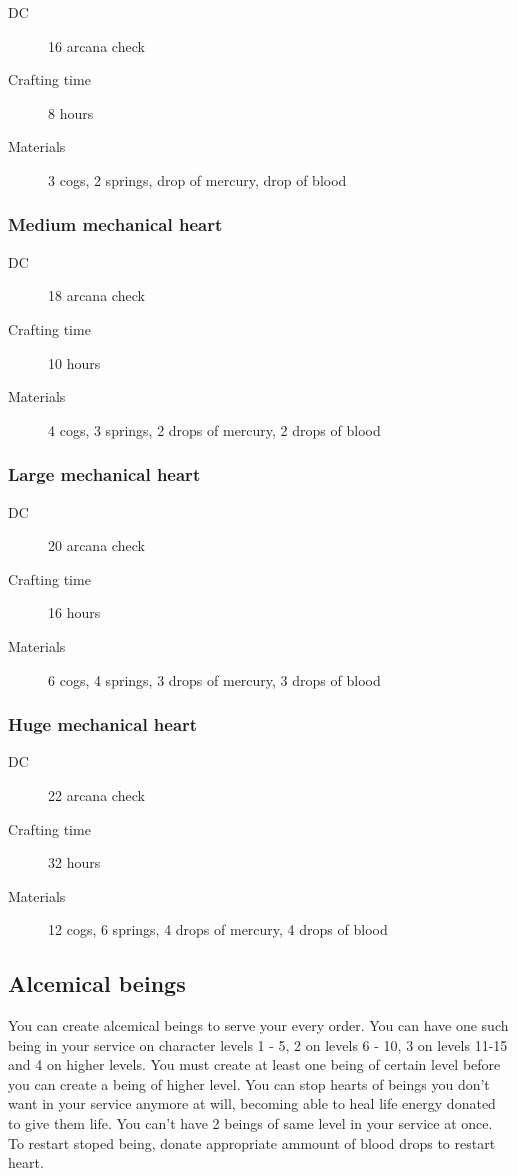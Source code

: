 \begin{description}
\item [DC] 16 arcana check
\item [Crafting time] 8 hours
\item [Materials] 3 cogs, 2 springs, drop of mercury, drop of blood
\end{description}

\subsubsection{Medium mechanical heart}

\begin{description}
\item [DC] 18 arcana check
\item [Crafting time] 10 hours
\item [Materials] 4 cogs, 3 springs, 2 drops of mercury, 2 drops of blood
\end{description}

\subsubsection{Large mechanical heart}

\begin{description}
\item [DC] 20 arcana check
\item [Crafting time] 16 hours
\item [Materials] 6 cogs, 4 springs, 3 drops of mercury, 3 drops of blood
\end{description}

\subsubsection{Huge mechanical heart}

\begin{description}
\item [DC] 22 arcana check
\item [Crafting time] 32 hours
\item [Materials] 12 cogs, 6 springs, 4 drops of mercury, 4 drops of blood
\end{description}

\subsection{Alcemical beings}

You can create alcemical beings to serve your every order. You can have one such being in your service on character levels 1 - 5, 2 on levels 6 - 10, 
3 on levels 11-15 and 4 on higher levels. You must create at least one being of certain level before you can create a being of higher level. You can stop
hearts of beings you don't want in your service anymore at will, becoming able to heal life energy donated to give them life. You can't have 2 beings of same
level in your service at once. To restart stoped being, donate appropriate ammount of blood drops to restart heart.

